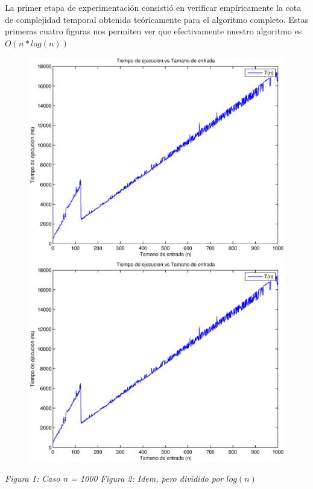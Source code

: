 La primer etapa de experimentación consistió en verificar empíricamente la cota de complejidad temporal obtenida teóricamente para el algoritmo completo. Estas primeras cuatro figuras nos permiten ver que efectivamente nuestro algoritmo es $O(n * log(n))$

\begin{figure}[H]
    \includegraphics[width=0.5\linewidth]{problema1/graficos/problema1_aleatoria_1000.eps}
    \includegraphics[width=0.5\linewidth]{problema1/graficos/problema1_aleatoria_1000.eps}
\end{figure}
\emph{\hspace{2,5cm}Figura 1: Caso n = 1000 \hspace{3cm}Figura 2: Idem, pero dividido por $log(n)$}

